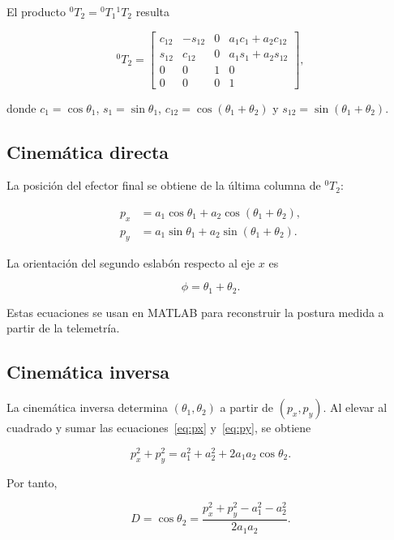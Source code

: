 \documentclass[11pt,a4paper]{article}
\begin{document}
El producto ${}^{0}T_2={}^{0}T_1{}^{1}T_2$ resulta

\begin{equation}
{}^{0}T_2=
\begin{bmatrix}
c_{12}&-s_{12}&0&a_1c_1+a_2c_{12}\\
s_{12}& c_{12}&0&a_1s_1+a_2s_{12}\\
0&0&1&0\\
0&0&0&1
\end{bmatrix},
\end{equation}

donde $c_1=\cos\theta_1$, $s_1=\sin\theta_1$, $c_{12}=\cos(\theta_1+\theta_2)$ y $s_{12}=\sin(\theta_1+\theta_2)$.

\subsection{Cinemática directa}

La posición del efector final se obtiene de la última columna de ${}^{0}T_2$:

\begin{align}
p_x&=a_1\cos\theta_1+a_2\cos(\theta_1+\theta_2),\label{eq:px}\\
p_y&=a_1\sin\theta_1+a_2\sin(\theta_1+\theta_2).\label{eq:py}
\end{align}

La orientación del segundo eslabón respecto al eje $x$ es

\begin{equation}
\phi=\theta_1+\theta_2.
\end{equation}

Estas ecuaciones se usan en MATLAB para reconstruir la postura medida a partir de la telemetría.

\subsection{Cinemática inversa}

La cinemática inversa determina $(\theta_1,\theta_2)$ a partir de $(p_x,p_y)$. Al elevar al cuadrado y sumar las ecuaciones~\eqref{eq:px} y~\eqref{eq:py}, se obtiene

\begin{equation}
p_x^2+p_y^2=a_1^2+a_2^2+2a_1a_2\cos\theta_2.
\end{equation}

Por tanto,

\begin{equation}
D=\cos\theta_2=
\frac{p_x^2+p_y^2-a_1^2-a_2^2}{2a_1a_2}.
\label{eq:D}
\end{equation}
\end{document}
